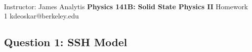 \documentclass[11pt]{article}
\begin{document}
\thispagestyle{empty}
\bigskip \
\vspace{0.1cm}

\begin{center}
{\fontsize{14}{14} \selectfont Instructor: James Analytis}
\vskip 16pt
{\fontsize{28}{28} \selectfont \bf \sffamily Physics 141B: Solid State Physics II}
\vskip 24pt
{\fontsize{14}{14} \selectfont \rmfamily Homework 1} 
\vskip 6pt
{\fontsize{14}{14} \selectfont \ttfamily kdeoskar@berkeley.edu} 
\vskip 24pt
\end{center}




\subsection*{Question 1: SSH Model}
\end{document}
